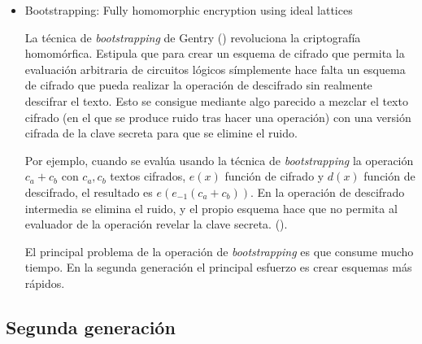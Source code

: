 \begin{itemize}

    \item Bootstrapping: Fully homomorphic encryption using ideal lattices

    La técnica de \textit{bootstrapping} de Gentry (\cite{gentry_fully_2009}) revoluciona la criptografía homomórfica. Estipula que para crear un esquema de cifrado que permita la evaluación arbitraria de circuitos lógicos símplemente hace falta un esquema de cifrado que pueda realizar la operación de descifrado sin realmente descifrar el texto. Esto se consigue mediante algo parecido a mezclar el texto cifrado (en el que se produce ruido tras hacer una operación) con una versión cifrada de la clave secreta para que se elimine el ruido.

    Por ejemplo, cuando se evalúa usando la técnica de \textit{bootstrapping} la operación $ c_a + c_b$ con $c_a, c_b$ textos cifrados, $e(x)$ función de cifrado y  $d(x)$ función de descifrado, el resultado es $e( e_{-1}(c_a + c_b) )$. En la operación de descifrado intermedia se elimina el ruido, y el propio esquema hace que no permita al evaluador de la operación revelar la clave secreta. (\cite{noauthor_homomorphic_nodate-3}).

    El principal problema de la operación de \textit{bootstrapping} es que consume mucho tiempo. En la segunda generación el principal esfuerzo es crear esquemas más rápidos.

\end{itemize}

\subsection{Segunda generación}

